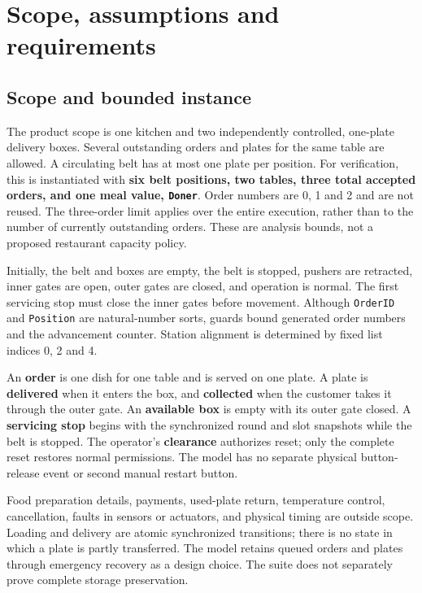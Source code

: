 \documentclass[11pt,a4paper]{article}
\begin{document}
\section{Scope, assumptions and requirements}
\label{sec:requirements}
\subsection{Scope and bounded instance}
The product scope is one kitchen and two independently controlled, one-plate delivery boxes. Several outstanding orders and plates for the same table are allowed. A circulating belt has at most one plate per position. For verification, this is instantiated with \textbf{six belt positions, two tables, three total accepted orders, and one meal value, \texttt{Doner}}. Order numbers are 0, 1 and 2 and are not reused. The three-order limit applies over the entire execution, rather than to the number of currently outstanding orders. These are analysis bounds, not a proposed restaurant capacity policy.

Initially, the belt and boxes are empty, the belt is stopped, pushers are retracted, inner gates are open, outer gates are closed, and operation is normal. The first servicing stop must close the inner gates before movement. Although \texttt{OrderID} and \texttt{Position} are natural-number sorts, guards bound generated order numbers and the advancement counter. Station alignment is determined by fixed list indices 0, 2 and 4.

An \textbf{order} is one dish for one table and is served on one plate. A plate is \textbf{delivered} when it enters the box, and \textbf{collected} when the customer takes it through the outer gate. An \textbf{available box} is empty with its outer gate closed. A \textbf{servicing stop} begins with the synchronized round and slot snapshots while the belt is stopped. The operator's \textbf{clearance} authorizes reset; only the complete reset restores normal permissions. The model has no separate physical button-release event or second manual restart button.

Food preparation details, payments, used-plate return, temperature control, cancellation, faults in sensors or actuators, and physical timing are outside scope. Loading and delivery are atomic synchronized transitions; there is no state in which a plate is partly transferred. The model retains queued orders and plates through emergency recovery as a design choice. The suite does not separately prove complete storage preservation.
\end{document}
